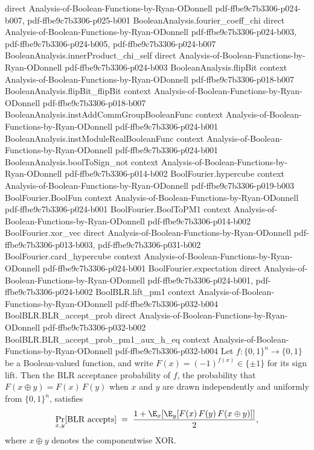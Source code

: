 \begin{lemma}
  {direct}
  {Analysis-of-Boolean-Functions-by-Ryan-ODonnell}
  {pdf-ffbe9c7b3306-p024-b007,
    pdf-ffbe9c7b3306-p025-b001}
\proofstep
  {BooleanAnalysis.fourier_coeff_chi}
  {direct}
  {Analysis-of-Boolean-Functions-by-Ryan-ODonnell}
  {pdf-ffbe9c7b3306-p024-b003,
    pdf-ffbe9c7b3306-p024-b005,
    pdf-ffbe9c7b3306-p024-b007}
\proofstep
  {BooleanAnalysis.innerProduct_chi_self}
  {direct}
  {Analysis-of-Boolean-Functions-by-Ryan-ODonnell}
  {pdf-ffbe9c7b3306-p024-b003}
\proofstep
  {BooleanAnalysis.flipBit}
  {context}
  {Analysis-of-Boolean-Functions-by-Ryan-ODonnell}
  {pdf-ffbe9c7b3306-p018-b007}
\proofstep
  {BooleanAnalysis.flipBit_flipBit}
  {context}
  {Analysis-of-Boolean-Functions-by-Ryan-ODonnell}
  {pdf-ffbe9c7b3306-p018-b007}
\proofstep
  {BooleanAnalysis.instAddCommGroupBooleanFunc}
  {context}
  {Analysis-of-Boolean-Functions-by-Ryan-ODonnell}
  {pdf-ffbe9c7b3306-p024-b001}
\proofstep
  {BooleanAnalysis.instModuleRealBooleanFunc}
  {context}
  {Analysis-of-Boolean-Functions-by-Ryan-ODonnell}
  {pdf-ffbe9c7b3306-p024-b001}
\proofstep
  {BooleanAnalysis.boolToSign_not}
  {context}
  {Analysis-of-Boolean-Functions-by-Ryan-ODonnell}
  {pdf-ffbe9c7b3306-p014-b002}
\proofstep
  {BoolFourier.hypercube}
  {context}
  {Analysis-of-Boolean-Functions-by-Ryan-ODonnell}
  {pdf-ffbe9c7b3306-p019-b003}
\proofstep
  {BoolFourier.BoolFun}
  {context}
  {Analysis-of-Boolean-Functions-by-Ryan-ODonnell}
  {pdf-ffbe9c7b3306-p024-b001}
\proofstep
  {BoolFourier.BoolToPM1}
  {context}
  {Analysis-of-Boolean-Functions-by-Ryan-ODonnell}
  {pdf-ffbe9c7b3306-p014-b002}
\proofstep
  {BoolFourier.xor_vec}
  {direct}
  {Analysis-of-Boolean-Functions-by-Ryan-ODonnell}
  {pdf-ffbe9c7b3306-p013-b003,
    pdf-ffbe9c7b3306-p031-b002}
\proofstep
  {BoolFourier.card_hypercube}
  {context}
  {Analysis-of-Boolean-Functions-by-Ryan-ODonnell}
  {pdf-ffbe9c7b3306-p024-b001}
\proofstep
  {BoolFourier.expectation}
  {direct}
  {Analysis-of-Boolean-Functions-by-Ryan-ODonnell}
  {pdf-ffbe9c7b3306-p024-b001,
    pdf-ffbe9c7b3306-p024-b002}
\proofstep
  {BoolBLR.lift_pm1}
  {context}
  {Analysis-of-Boolean-Functions-by-Ryan-ODonnell}
  {pdf-ffbe9c7b3306-p032-b004}
\proofstep
  {BoolBLR.BLR_accept_prob}
  {direct}
  {Analysis-of-Boolean-Functions-by-Ryan-ODonnell}
  {pdf-ffbe9c7b3306-p032-b002}
\proofstep
  {BoolBLR.BLR_accept_prob_pm1_aux_h_eq}
  {context}
  {Analysis-of-Boolean-Functions-by-Ryan-ODonnell}
  {pdf-ffbe9c7b3306-p032-b004}
Let $f : \{0,1\}^n \to \{0,1\}$ be a Boolean-valued function, and write $F(x) =
(-1)^{f(x)} \in \{\pm 1\}$ for its sign lift. Then the BLR acceptance probability of
$f$, the probability that $F(x \oplus y) = F(x)\,F(y)$ when $x$ and $y$ are drawn
independently and uniformly from $\{0,1\}^n$, satisfies
\[
  \Pr_{x,y}[\text{BLR accepts}]
  \;=\;
  \frac{1 + \E_{x}\!\left[\E_{y}\!\left[ F(x)\,F(y)\,F(x \oplus y) \right]\right]}{2},
\]
where $x \oplus y$ denotes the componentwise XOR.
\end{lemma}


